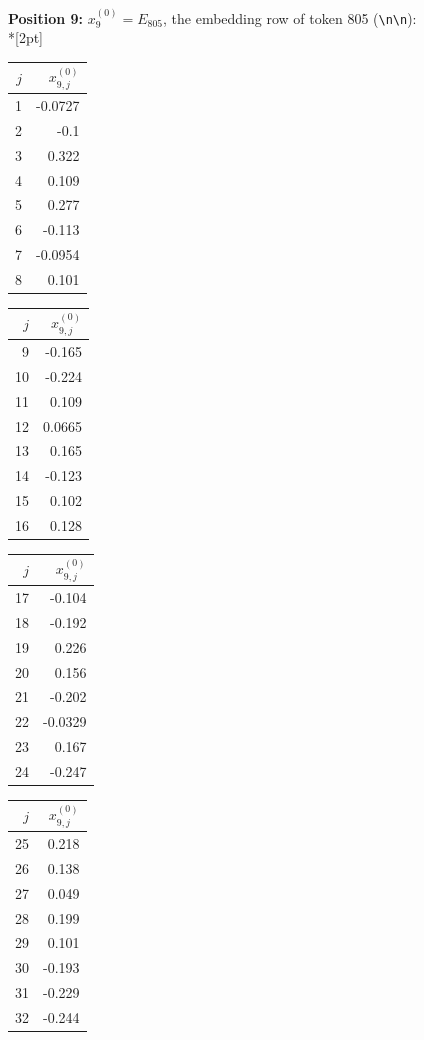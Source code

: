 \noindent \textbf{Position 9:} $x^{(0)}_{9} = E_{805}$, the embedding row of token 805 (\texttt{\textbackslash{}n\textbackslash{}n}):\\*[2pt]
{\tablefont \begin{tabular}[t]{r|r}
$j$ & $x^{(0)}_{9,j}$ \\\hline
1 & -0.0727 \\
2 & -0.1 \\
3 & 0.322 \\
4 & 0.109 \\
5 & 0.277 \\
6 & -0.113 \\
7 & -0.0954 \\
8 & 0.101
\end{tabular}\kern4pt
\begin{tabular}[t]{r|r}
$j$ & $x^{(0)}_{9,j}$ \\\hline
9 & -0.165 \\
10 & -0.224 \\
11 & 0.109 \\
12 & 0.0665 \\
13 & 0.165 \\
14 & -0.123 \\
15 & 0.102 \\
16 & 0.128
\end{tabular}\kern4pt
\begin{tabular}[t]{r|r}
$j$ & $x^{(0)}_{9,j}$ \\\hline
17 & -0.104 \\
18 & -0.192 \\
19 & 0.226 \\
20 & 0.156 \\
21 & -0.202 \\
22 & -0.0329 \\
23 & 0.167 \\
24 & -0.247
\end{tabular}\kern4pt
\begin{tabular}[t]{r|r}
$j$ & $x^{(0)}_{9,j}$ \\\hline
25 & 0.218 \\
26 & 0.138 \\
27 & 0.049 \\
28 & 0.199 \\
29 & 0.101 \\
30 & -0.193 \\
31 & -0.229 \\
32 & -0.244
\end{tabular}\kern4pt
\begin{tabular}[t]{r|r}

\end{tabular}}
